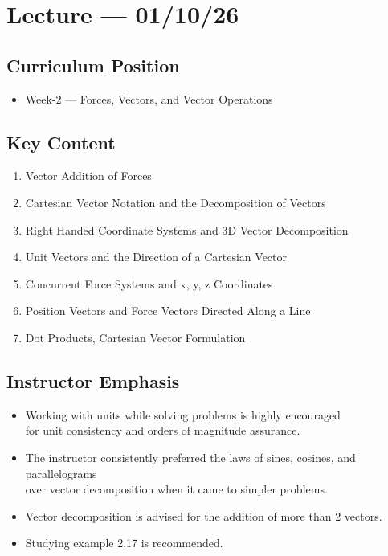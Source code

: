 \section{Lecture — 01/10/26}


\subsection*{Curriculum Position}
\begin{itemize}
    \item Week-2 — Forces, Vectors, and Vector Operations
\end{itemize}

\subsection*{Key Content}
\begin{enumerate}
    \item Vector Addition of Forces
    \item Cartesian Vector Notation and the Decomposition of Vectors
    \item Right Handed Coordinate Systems and 3D Vector Decomposition
    \item Unit Vectors and the Direction of a Cartesian Vector
    \item Concurrent Force Systems and x, y, z Coordinates 
    \item Position Vectors and Force Vectors Directed Along a Line
    \item Dot Products, Cartesian Vector Formulation
    
    
\end{enumerate}

\subsection*{Instructor Emphasis}
\begin{itemize}
    \item Working with units while solving problems is highly encouraged \\ 
        for unit consistency and orders of magnitude assurance.
    \item The instructor consistently preferred the laws of sines, cosines, and parallelograms      \\ over vector decomposition when it came to simpler problems. 
    \item Vector decomposition is advised for the addition of more than 2 vectors.
    \item Studying example 2.17 is recommended.   
        
\end{itemize} 

